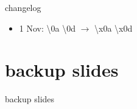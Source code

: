 \date{}
\title{}
\date{}

\begin{frame}
    \titlepage
\end{frame}

{\changelogmode
\begin{frame}{changelog}
    \begin{itemize}
    \item 1 Nov: \textbackslash 0a \textbackslash 0d $\rightarrow$ \textbackslash x0a \textbackslash x0d
    \end{itemize}
\end{frame}
}



\section{backup slides}
\begin{frame}{backup slides}
\end{frame}


